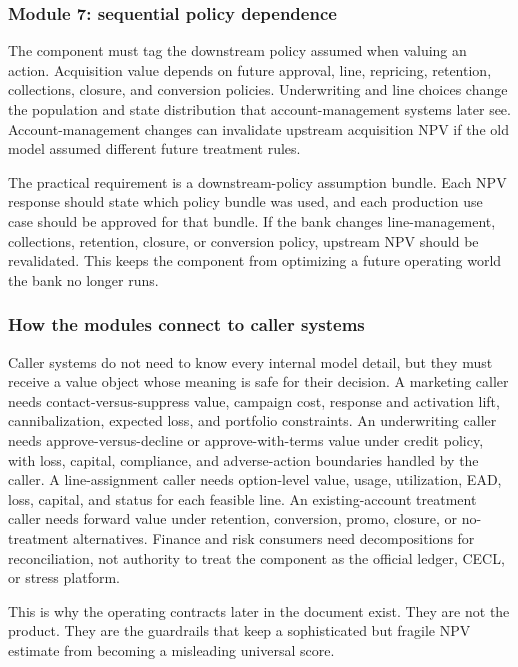 \documentclass[11pt]{article}
\newcommand{\1}{\mathbf{1}}
\begin{document}
\subsubsection{Module 7: sequential policy dependence}
\label{subsec:module-policy}

The component must tag the downstream policy assumed when valuing an action.
Acquisition value depends on future approval, line, repricing, retention,
collections, closure, and conversion policies. Underwriting and line choices
change the population and state distribution that account-management systems
later see. Account-management changes can invalidate upstream acquisition NPV
if the old model assumed different future treatment rules.

The practical requirement is a downstream-policy assumption bundle. Each NPV
response should state which policy bundle was used, and each production use
case should be approved for that bundle. If the bank changes line-management,
collections, retention, closure, or conversion policy, upstream NPV should be
revalidated. This keeps the component from optimizing a future operating world
the bank no longer runs.

\subsubsection{How the modules connect to caller systems}
\label{subsec:modules-to-callers}

Caller systems do not need to know every internal model detail, but they must
receive a value object whose meaning is safe for their decision. A marketing
caller needs contact-versus-suppress value, campaign cost, response and
activation lift, cannibalization, expected loss, and portfolio constraints. An
underwriting caller needs approve-versus-decline or approve-with-terms value
under credit policy, with loss, capital, compliance, and adverse-action
boundaries handled by the caller. A line-assignment caller needs option-level
value, usage, utilization, EAD, loss, capital, and status for each feasible
line. An existing-account treatment caller needs forward value under retention,
conversion, promo, closure, or no-treatment alternatives. Finance and risk
consumers need decompositions for reconciliation, not authority to treat the
component as the official ledger, CECL, or stress platform.

This is why the operating contracts later in the document exist. They are not
the product. They are the guardrails that keep a sophisticated but fragile NPV
estimate from becoming a misleading universal score.
\end{document}
